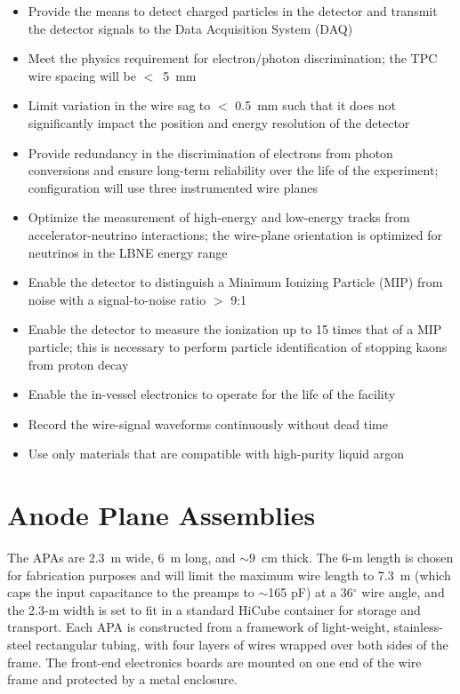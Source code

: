\begin{itemize}	
\item Provide the means to detect charged particles in the detector and transmit the detector signals to the Data Acquisition System (DAQ)
\item Meet the physics requirement for electron/photon discrimination;  the TPC wire spacing will be $<$~5~mm
\item Limit variation in the wire sag to $<$ 0.5~mm such that it does not significantly impact the position and energy resolution of the detector
\item Provide redundancy in the discrimination of electrons from photon conversions and ensure long-term reliability over the life of the experiment;  configuration will use three instrumented wire planes
\item Optimize the measurement of high-energy and low-energy tracks from accelerator-neutrino interactions; the wire-plane orientation is optimized for neutrinos in the LBNE energy range
\item Enable the detector to distinguish a Minimum Ionizing Particle (MIP) from noise with a signal-to-noise ratio $>$ 9:1
\item Enable the detector to measure the ionization up to 15 times that of a MIP particle; this is necessary to perform particle identification of stopping kaons from proton decay
\item Enable the in-vessel electronics to operate for the life of the facility
\item Record the wire-signal waveforms continuously without dead time
\item Use only materials that are compatible with high-purity liquid argon

\end{itemize}

\section{Anode Plane Assemblies}
\label{subsec:v5-tpc-chamber-apa}

The APAs are 2.3~m wide, 6~m long, and $\sim 9$~cm thick. The 6-m length is chosen for fabrication purposes and will limit the maximum wire length to 7.3~m (which caps the input capacitance to the preamps to $\sim$165 pF) at a 36$^\circ$ wire angle, and the 2.3-m width is set to fit in a standard HiCube container for storage and transport. 
Each APA is constructed from a framework of light-weight, stainless-steel rectangular tubing, 
with four layers of
wires wrapped over both sides of the frame.  The front-end electronics boards are mounted on 
one end of the wire frame and protected by a metal enclosure.  

